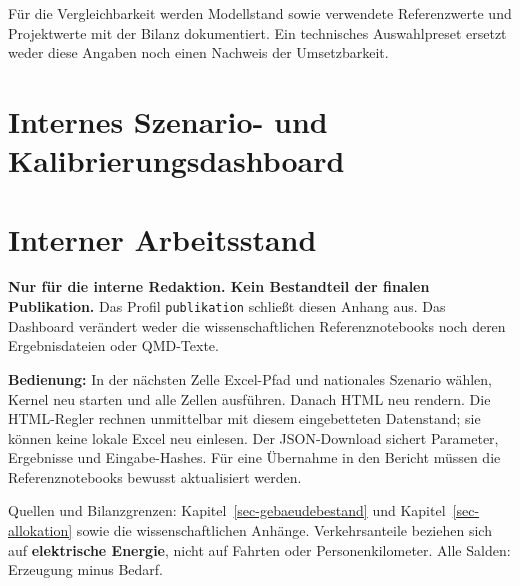 \documentclass[
  ngerman,
  a4paper,
  DIV=11]{scrreprt}
\begin{document}
Für die Vergleichbarkeit werden Modellstand sowie verwendete
Referenzwerte und Projektwerte mit der Bilanz dokumentiert. Ein
technisches Auswahlpreset ersetzt weder diese Angaben noch einen
Nachweis der Umsetzbarkeit.

\chapter{Internes Szenario- und
Kalibrierungsdashboard}\label{internes-szenario--und-kalibrierungsdashboard}

\chapter{Interner Arbeitsstand}\label{sec-internes-dashboard}

\textbf{Nur für die interne Redaktion. Kein Bestandteil der finalen
Publikation.} Das Profil \texttt{publikation} schließt diesen Anhang
aus. Das Dashboard verändert weder die wissenschaftlichen
Referenznotebooks noch deren Ergebnisdateien oder QMD-Texte.

\textbf{Bedienung:} In der nächsten Zelle Excel-Pfad und nationales
Szenario wählen, Kernel neu starten und alle Zellen ausführen. Danach
HTML neu rendern. Die HTML-Regler rechnen unmittelbar mit diesem
eingebetteten Datenstand; sie können keine lokale Excel neu einlesen.
Der JSON-Download sichert Parameter, Ergebnisse und Eingabe-Hashes. Für
eine Übernahme in den Bericht müssen die Referenznotebooks bewusst
aktualisiert werden.

Quellen und Bilanzgrenzen: Kapitel~\ref{sec-gebaeudebestand} und
Kapitel~\ref{sec-allokation} sowie die wissenschaftlichen Anhänge.
Verkehrsanteile beziehen sich auf \textbf{elektrische Energie}, nicht
auf Fahrten oder Personenkilometer. Alle Salden: Erzeugung minus Bedarf.
\end{document}
